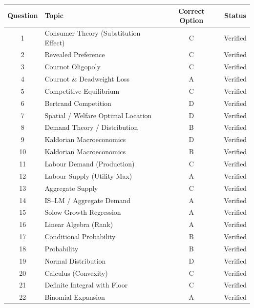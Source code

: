 \documentclass[11pt]{article}
\begin{document}
\begin{center}
\begin{longtable}{c l c c}
\toprule
Question & Topic & Correct Option & Status \\
\midrule
1  & Consumer Theory (Substitution Effect)        & C & Verified \\
2  & Revealed Preference                          & C & Verified \\
3  & Cournot Oligopoly                            & C & Verified \\
4  & Cournot \& Deadweight Loss                   & A & Verified \\
5  & Competitive Equilibrium                      & C & Verified \\
6  & Bertrand Competition                         & D & Verified \\
7  & Spatial / Welfare Optimal Location           & D & Verified \\
8  & Demand Theory / Distribution                 & B & Verified \\
9  & Kaldorian Macroeconomics                     & D & Verified \\
10 & Kaldorian Macroeconomics                     & B & Verified \\
11 & Labour Demand (Production)                   & C & Verified \\
12 & Labour Supply (Utility Max)                  & A & Verified \\
13 & Aggregate Supply                             & C & Verified \\
14 & IS--LM / Aggregate Demand                    & A & Verified \\
15 & Solow Growth Regression                      & A & Verified \\
16 & Linear Algebra (Rank)                        & A & Verified \\
17 & Conditional Probability                      & B & Verified \\
18 & Probability                                  & B & Verified \\
19 & Normal Distribution                          & D & Verified \\
20 & Calculus (Convexity)                         & C & Verified \\
21 & Definite Integral with Floor                 & C & Verified \\
22 & Binomial Expansion                           & A & Verified \\

\end{longtable}
\end{center}
\end{document}
